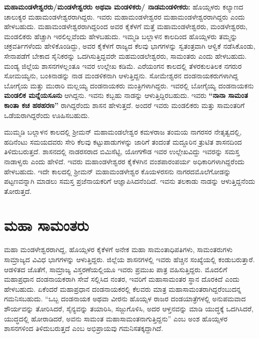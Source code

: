 \textbf{ಮಹಾಮಂಡಳೇಶ್ವರರು/ಮಂಡಳೇಶ್ವರರು ಅಥವಾ ಮಂಡಳಿಕರು/ ನಾಡಮಂಡಳೀಕರು:} ಹೊಯ್ಸಳರು ಕಲ್ಯಾಣದ ಚಾಲುಕ್ಯರ ಮಹಾಮಂಡಳೇಶ್ವರರಾಗಿದ್ದರು. ಇವರು ಮಹಾಮಂಡಳೇಶ್ವರರ ಮಹಾಮಂಡಳೇಶ್ವರರಾಗಿದ್ದರು ಎಂದು ಹೇಳಬಹುದು. ಮಹಾಮಂಡಳೇಶ್ವರರಾಗಿದ್ದರಿಂದ ಅವರ ಕೈಕೆಳಗೆ ಮತ್ತೆ ಮಹಾಮಂಡಳೇಶ್ವರರು, ಮಂಡಳೇಶ್ವರರು, ಮಂಡಲಿಕರು ಹೆಚ್ಚಾಗಿ ಇರಲಿಲ್ಲವೆಂದು ಹೇಳಬಹುದು. ಇಮ್ಮಡಿ ಬಲ್ಲಾಳನ ಕಾಲದಿಂದ ಹೊಯ್ಸಳರು ತಮ್ಮನ್ನು ಚಕ್ರವರ್ತಿ\-ಗಳೆಂದು ಹೇಳಿಕೊಂಡಿದ್ದು, ಅವರ ಕೈಕೆಳಗೆ ರಾಜ್ಯದ ಕೆಲವು ಭಾಗಗಳನ್ನು ಸ್ವತಂತ್ರವಾಗಿ ಆಳ್ವಿಕೆ ನಡೆಸಿಕೊಂಡು, ಸೇನಾಪಡೆಗೆ ಬೇಕಾದ ಸೈನಿಕರನ್ನು ಒದಗಿಸುತ್ತಿದ್ದವರೇ ಮಹಮಂಡಲೇಶ್ವರರು, ಸಾಮಂತರು ಎಂದು ಹೇಳಬಹುದು. ಮಂಡ್ಯ ಜಿಲ್ಲೆಯ ಶಾಸನಗಳಲ್ಲಂತೂ ಇವರ ಉಲ್ಲೇಖ ಕಡಿಮೆ. ಎರೆಯಂಗನ ಕಾಲದಲ್ಲಿ ತೆಳರಕುಲತಿಲಕ ನಗರುರ ಸೋಮಯ್ಯನು, ಬಂಕಿನಾಡನ್ನು ನಾಡ ಮಂಡಳಿಕನಾಗಿ ಆಳುತ್ತಿದ್ದನು. ಸೋಮೇಶ್ವರನ ದಂಡನಾಯಕರುಗಳಾಗಿದ್ದ ಬೋಗೈಯ ಮತ್ತು ಮುರಾರಿ ಮಲ್ಲಯ್ಯ ದಂಡನಾಯಕರು ಮಂತ್ರಿಗಳಾಗಿದ್ದರು. ಇವರಲ್ಲಿ ಬೋಗೈಯ್ಯ ದಂಡನಾಯಕನು \textbf{ಮಂಡಲಿಕ ಮನ್ನೆಯಸೂನು} ಆಗಿದ್ದನು. ಇವನು ಕಬ್ಬಹು ನಾಡನ್ನು ಆಳುತ್ತಿದ್ದಿರಬಹುದು. ಇವರು \textbf{“ನಾನಾ ಸಾಮಂತ ಕಾಂತಾ ಕಚ ಹಠಹರಣ”} ರಾಗಿದ್ದರೆಂದು ಶಾಸನ ಹೇಳುತ್ತದೆ. ಅಂದರೆ ಇವರು ಮಂಡಲಿಕರು ಮತ್ತು ಸಾಮಂತರಿಗೆ ಒಡೆಯರಾಗಿದ್ದರೆಂದು ಊಹಿಸಬಹುದು.

\newpage

ಮುಮ್ಮಡಿ ಬಲ್ಲಾಳನ ಕಾಲದಲ್ಲಿ ಶ‍್ರೀಮನ್​ ಮಹಾಮಂಡಲೇಶ್ವರ ಕಮಳರಾಜ ತಂಮಯ ನಾಗರಸರ ನೇತೃತ್ವದಲ್ಲಿ, ಹದಿನೆಂಟು ಸಮಯದವರು ಸೇರಿ ಕೆಲವು ಕಟ್ಟುಪಾಡುಗಳನ್ನು ಜಾರಿಗೆ ತಂದಂತೆ ಮದ್ದೂರಿನ ತ್ರುಟಿತ ಶಾಸನದಿಂದ ತಿಳಿದುಬರುತ್ತದೆ. ಶಾಸನದಲ್ಲಿ ನಾಡರಸರಾದ ಬಿಮಿಸೆಟ್ಟಿ, ಯೋಗಗೌಡ ಇವರ ಉಲ್ಲೇಖವಿದ್ದು ಇವರನ್ನು ಸಮಸ್ತ ನಾಡಾಳ್ವರು ಎಂದು ಹೇಳಿದೆ. ಇವರು ಮಹಾಂಡಳೇಶ್ವರರ ಕೈಕೆಳಗಿನ ವಂಶಪಾರಂಪರ್ಯ ಅಧಿಕಾರಿಗಳಾಗಿದ್ದರೆಂದು ಹೇಳಬಹುದು. ಇದೇ ಕಾಲದಲ್ಲಿ ಶ‍್ರೀಮನ್​ ಮಹಾಮಂಡಳೇಶ್ವರ ಕೊಯಳರಸನು ನಾಗರದಮೊಲೆಗೋಡನ್ನು ಪಟ್ಟಣವನ್ನಾಗಿ ಮಾಡಲು ಸಮಸ್ತ ಪ್ರಜೆನಾಯಕರಿಗೆ ಆಜ್ಞಾಪಿಸಿದನೆಂದಿದೆ. ಇವನು ತಲಕಾಡು ನಾಡನ್ನು ಆಳುತ್ತಿದ್ದನೆಂದು ತೋರುತ್ತದೆ.

\section*{ಮಹಾ ಸಾಮಂತರು}

ಮಹಾ ಮಂಡಳೇಶ್ವರರಾಗಿದ್ದ, ಹೊಯ್ಸಳರ ಕೈಕೆಳಗೆ ಅನೇಕ ಮಹಾ ಸಾಮಂತಾಧಿಪತಿಗಳು, ಸಾಮಂತರುಗಳು ಸಾಮ್ರಾಜ್ಯದ ವಿವಿಧ ಭಾಗಗಳನ್ನು ಆಳುತ್ತಿದ್ದರು. ಜಿಲ್ಲೆಯ ಶಾಸನಗಳಲ್ಲಿ ಇವರು ಹೆಚ್ಚಿನ ಸಂಖ್ಯೆಯಲ್ಲಿ ಕಂಡುಬರುತ್ತಾರೆ. ಆಡಳಿತದ ಜೊತೆಗೆ, ಸಾಮ್ರಾಜ್ಯ ವಿಸ್ತರಣೆಯಲ್ಲಿಯೂ ಇವರು ಪ್ರಮುಖ ಪಾತ್ರ ವಹಿಸುತ್ತಿದ್ದರು. ಮೊದಲಿಗೆ ಮಹಾಪ್ರಧಾನ ದಂಡನಾಯಕರಾಗಿ ಸೇವೆ ಸಲ್ಲಿಸಿದ ನಂತರ, ಇವರಿಗೆ ಮಹಾಸಾಮಂತರ ಸ್ಥಾನ ದೊರಕಿದೆ ಎಂದು ಹೇಳಬಹುದು. ಏಕೆಂದರೆ ಮಹಾಪ್ರಧಾನ ದಂಡನಾಯಕರಲ್ಲಿ ಕೆಲವರು ಮಾತ್ರ ಮಹಾಸಾಮಂತರಾಗಿದ್ದರೆಂಬುದನ್ನ ಗಮನಿಸಬಹುದು. “ಒಬ್ಬ ದಂಡನಾಯಕ ಅಥವಾ ವೀರನು ಹೊಯ್ಸಳ ರಾಜರ ದಂಡಯಾತ್ರೆಗಳಲ್ಲಿ ಅನುಪಮವಾದ ಶೌರ್ಯವನ್ನು ತೋರಿಸಿದರೆ, ಸೈನ್ಯವನ್ನು ತಯಾರಿಸಿ, ಸಜ್ಜುಗೊಳಿಸಿ, ಅದರ ಆಳ್ತನವನ್ನು ಮಾಡಿ ಯುದ್ಧಕ್ಕೆ ಒದಗಿಸಿದರೆ, ಯುದ್ಧದಲ್ಲಿ ಹೋರಾಡಿದರೆ, ಅವನು ಸಾಮಂತ ಮಹಾಸಾಮಂತನಾಗುತ್ತಿದ್ದನು” ಎಂಬ ಅಂಶ ಹೊಯ್ಸಳರ ಶಾಸನಗಳಿಂದ ತಿಳಿದುಬರುತ್ತದೆ ಎಂಬ ಅಭಿಪ್ರಾಯವು ಗಮನಿಸತಕ್ಕದ್ದಾಗಿದೆ.

